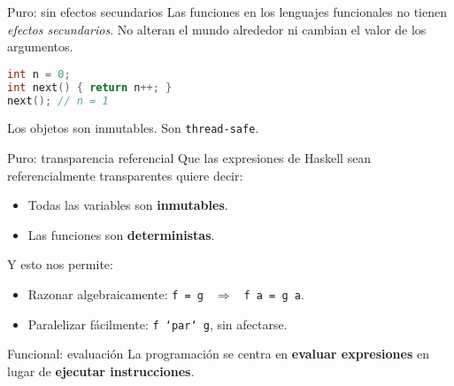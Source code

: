 \begin{frame}[fragile]{Puro: sin efectos secundarios}
    Las funciones en los lenguajes funcionales no tienen \textit{efectos secundarios}.
    No alteran el mundo alrededor ni cambian el valor de los argumentos.
    \espacio
  \begin{lstlisting}[language=C++]
int n = 0;
int next() { return n++; }
next(); // n = 1
  \end{lstlisting}
    \espacio
  
    Los objetos son inmutables. Son \texttt{thread-safe}.

\end{frame}

\begin{frame}[fragile]{Puro: transparencia referencial}
  Que las expresiones de Haskell sean referencialmente transparentes
  quiere decir:
  \begin{itemize}
   \item Todas las variables son \textbf{inmutables}.
   \item Las funciones son \textbf{deterministas}.
  \end{itemize}

  \espacio
  
  Y esto nos permite:
  \begin{itemize}
   \item Razonar algebraicamente: \texttt{f = g } $\Rightarrow$ \texttt{ f a = g a}.
   \item Paralelizar fácilmente: \texttt{f `par` g}, sin afectarse.
  \end{itemize}

  
    
\end{frame}

\begin{frame}[fragile]{Funcional: evaluación}
  La programación se centra en \textbf{evaluar expresiones} en
  lugar de \textbf{ejecutar instrucciones}.
\end{frame}

